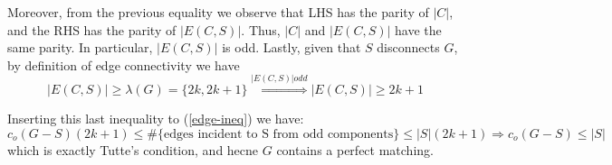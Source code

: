 \documentclass[a4paper, 10pt]{article}
\theoremstyle{definition} %
\begin{document}
Moreover, from the previous equality we observe that LHS has the parity of $|C|$, and the RHS has the parity of $|E(C,S)|$. Thus, $|C|$ and $|E(C,S)|$ have the same parity. In particular, $|E(C,S)|$ is odd. Lastly, given that $S$ disconnects $G$, by definition of edge connectivity we have
$$|E(C,S)| \geq \lambda(G) = \lbrace 2k, 2k + 1 \rbrace \overset{|E(C,S)| odd}{\Longrightarrow} |E(C,S)| \geq 2k + 1$$

Inserting this last inequality to (\ref{edge-ineq}) we have:
$$c_o(G-S)(2k + 1) \leq \#\lbrace\text{edges incident to S from odd components}\rbrace \leq |S|(2k + 1) \Rightarrow c_o(G-S) \leq |S|$$
which is exactly Tutte's condition, and hecne $G$ contains a perfect matching.
\end{document}
